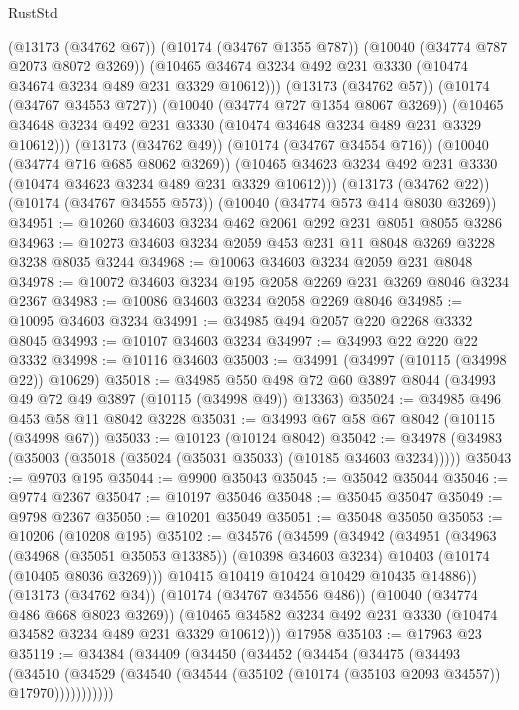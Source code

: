 \begin{lexlean}{RustStd}
\begin{coremodule}
          (@13173 (@34762 @67))
          (@10174 (@34767 @1355 @787))
          (@10040 (@34774 @787 @2073 @8072 @3269))
          (@10465 @34674 @3234 @492 @231 @3330 (@10474 @34674 @3234 @489 @231 @3329 @10612)))
        (@13173 (@34762 @57))
        (@10174 (@34767 @34553 @727))
        (@10040 (@34774 @727 @1354 @8067 @3269))
        (@10465 @34648 @3234 @492 @231 @3330 (@10474 @34648 @3234 @489 @231 @3329 @10612)))
      (@13173 (@34762 @49))
      (@10174 (@34767 @34554 @716))
      (@10040 (@34774 @716 @685 @8062 @3269))
      (@10465 @34623 @3234 @492 @231 @3330 (@10474 @34623 @3234 @489 @231 @3329 @10612)))
    (@13173 (@34762 @22))
    (@10174 (@34767 @34555 @573))
    (@10040 (@34774 @573 @414 @8030 @3269))
@34951 := @10260 @34603 @3234 @462 @2061 @292 @231 @8051 @8055 @3286
@34963 := @10273 @34603 @3234 @2059 @453 @231 @11 @8048 @3269 @3228 @3238 @8035 @3244
@34968 := @10063 @34603 @3234 @2059 @231 @8048
@34978 := @10072 @34603 @3234 @195 @2058 @2269 @231 @3269 @8046 @3234 @2367
@34983 := @10086 @34603 @3234 @2058 @2269 @8046
@34985 := @10095 @34603 @3234
@34991 := @34985 @494 @2057 @220 @2268 @3332 @8045
@34993 := @10107 @34603 @3234
@34997 := @34993 @22 @220 @22 @3332
@34998 := @10116 @34603
@35003 := @34991 (@34997 (@10115 (@34998 @22)) @10629)
@35018 := @34985
    @550
    @498
    @72
    @60
    @3897
    @8044
    (@34993 @49 @72 @49 @3897 (@10115 (@34998 @49)) @13363)
@35024 := @34985 @496 @453 @58 @11 @8042 @3228
@35031 := @34993 @67 @58 @67 @8042 (@10115 (@34998 @67))
@35033 := @10123 (@10124 @8042)
@35042 := @34978 (@34983 (@35003 (@35018 (@35024 (@35031 @35033) (@10185 @34603 @3234)))))
@35043 := @9703 @195
@35044 := @9900 @35043
@35045 := @35042 @35044
@35046 := @9774 @2367
@35047 := @10197 @35046
@35048 := @35045 @35047
@35049 := @9798 @2367
@35050 := @10201 @35049
@35051 := @35048 @35050
@35053 := @10206 (@10208 @195)
@35102 := @34576
    (@34599
      (@34942
        (@34951
          (@34963
            (@34968 (@35051 @35053 @13385))
            (@10398 @34603 @3234)
            @10403
            (@10174 (@10405 @8036 @3269)))
          @10415
          @10419
          @10424
          @10429
          @10435
          @14886))
      (@13173 (@34762 @34))
      (@10174 (@34767 @34556 @486))
      (@10040 (@34774 @486 @668 @8023 @3269))
      (@10465 @34582 @3234 @492 @231 @3330 (@10474 @34582 @3234 @489 @231 @3329 @10612)))
    @17958
@35103 := @17963 @23
@35119 := @34384
    (@34409
      (@34450
        (@34452
          (@34454
            (@34475
              (@34493
                (@34510
                  (@34529 (@34540 (@34544 (@35102 (@10174 (@35103 @2093 @34557)) @17970)))))))))))

\end{coremodule}
\end{lexlean}
